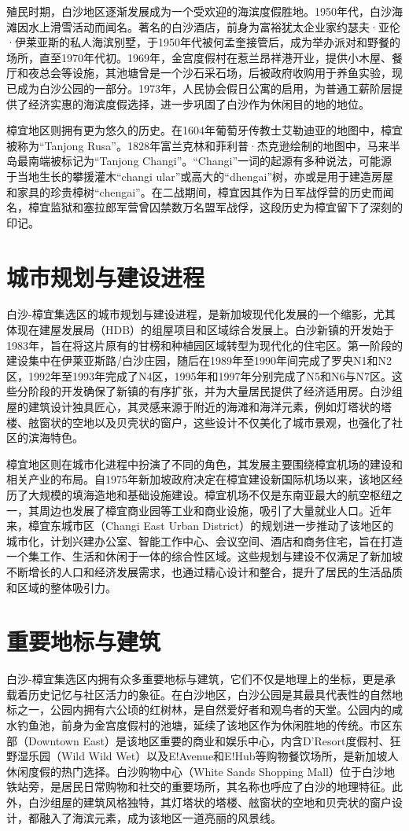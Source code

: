 \documentclass[11pt,a4paper,twoside,openany]{book}
\begin{document}
殖民时期，白沙地区逐渐发展成为一个受欢迎的海滨度假胜地。1950年代，白沙海滩因水上滑雪活动而闻名。著名的白沙酒店，前身为富裕犹太企业家约瑟夫·亚伦·伊莱亚斯的私人海滨别墅，于1950年代被何孟奎接管后，成为举办派对和野餐的场所，直至1970年代初。1969年，金宫度假村在惹兰昂祥港开业，提供小木屋、餐厅和夜总会等设施，其池塘曾是一个沙石采石场，后被政府收购用于养鱼实验，现已成为白沙公园的一部分。1973年，人民协会假日公寓的启用，为普通工薪阶层提供了经济实惠的海滨度假选择，进一步巩固了白沙作为休闲目的地的地位。

樟宜地区则拥有更为悠久的历史。在1604年葡萄牙传教士艾勒迪亚的地图中，樟宜被称为“Tanjong Rusa”。1828年富兰克林和菲利普·杰克逊绘制的地图中，马来半岛最南端被标记为“Tanjong Changi”。“Changi”一词的起源有多种说法，可能源于当地生长的攀援灌木“changi ular”或高大的“dhengai”树，亦或是用于建造房屋和家具的珍贵樟树“chengai”。在二战期间，樟宜因其作为日军战俘营的历史而闻名，樟宜监狱和塞拉郎军营曾囚禁数万名盟军战俘，这段历史为樟宜留下了深刻的印记。

\section{城市规划与建设进程}
白沙-樟宜集选区的城市规划与建设进程，是新加坡现代化发展的一个缩影，尤其体现在建屋发展局（HDB）的组屋项目和区域综合发展上。白沙新镇的开发始于1983年，旨在将这片原有的甘榜和种植园区域转型为现代化的住宅区。第一阶段的建设集中在伊莱亚斯路/白沙庄园，随后在1989年至1990年间完成了罗央N1和N2区，1992年至1993年完成了N4区，1995年和1997年分别完成了N5和N6与N7区。这些分阶段的开发确保了新镇的有序扩张，并为大量居民提供了经济适用房。白沙组屋的建筑设计独具匠心，其灵感来源于附近的海滩和海洋元素，例如灯塔状的塔楼、舷窗状的空地以及贝壳状的窗户，这些设计不仅美化了城市景观，也强化了社区的滨海特色。

樟宜地区则在城市化进程中扮演了不同的角色，其发展主要围绕樟宜机场的建设和相关产业的布局。自1975年新加坡政府决定在樟宜建设新国际机场以来，该地区经历了大规模的填海造地和基础设施建设。樟宜机场不仅是东南亚最大的航空枢纽之一，其周边也发展了樟宜商业园等工业和商业设施，吸引了大量就业人口。近年来，樟宜东城市区（Changi East Urban District）的规划进一步推动了该地区的城市化，计划兴建办公室、智能工作中心、会议空间、酒店和商务住宅，旨在打造一个集工作、生活和休闲于一体的综合性区域。这些规划与建设不仅满足了新加坡不断增长的人口和经济发展需求，也通过精心设计和整合，提升了居民的生活品质和区域的整体吸引力。

\section{重要地标与建筑}
白沙-樟宜集选区内拥有众多重要地标与建筑，它们不仅是地理上的坐标，更是承载着历史记忆与社区活力的象征。在白沙地区，白沙公园是其最具代表性的自然地标之一，公园内拥有六公顷的红树林，是自然爱好者和观鸟者的天堂。公园内的咸水钓鱼池，前身为金宫度假村的池塘，延续了该地区作为休闲胜地的传统。市区东部（Downtown East）是该地区重要的商业和娱乐中心，内含D’Resort度假村、狂野湿乐园（Wild Wild Wet）以及E!Avenue和E!Hub等购物餐饮场所，是新加坡人休闲度假的热门选择。白沙购物中心（White Sands Shopping Mall）位于白沙地铁站旁，是居民日常购物和社交的重要场所，其名称也呼应了白沙的地理特征。此外，白沙组屋的建筑风格独特，其灯塔状的塔楼、舷窗状的空地和贝壳状的窗户设计，都融入了海滨元素，成为该地区一道亮丽的风景线。
\end{document}
